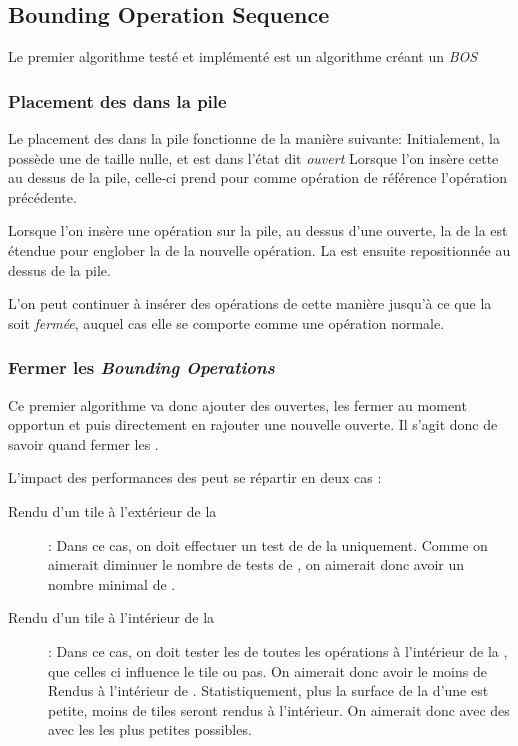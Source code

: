 		\subsection{Bounding Operation Sequence}
			Le premier algorithme testé et implémenté est un algorithme créant un \emph{BOS}
			
			\subsubsection{Placement des \BO dans la pile}
			Le placement des \BO dans la pile fonctionne de la manière suivante: Initialement, la \BO possède une \BB
			de taille nulle, et est dans l'état dit \emph{ouvert} Lorsque l'on insère cette \BO au dessus de la pile, 
			celle-ci prend pour comme opération de référence l'opération précédente. 

			Lorsque l'on insère une opération sur la pile, au dessus d'une \BO ouverte, la \BB de la \BO est étendue
			pour englober la \BB de la nouvelle opération. La \BB est ensuite repositionnée au dessus de la pile. 

			L'on peut continuer à insérer des opérations de cette manière jusqu'à ce que la \BO soit \emph{fermée},
			auquel cas elle se comporte comme une opération normale. 

			\subsubsection{Fermer les \emph{Bounding Operations}}
			Ce premier algorithme va donc ajouter des \BO ouvertes, les fermer au moment opportun et puis directement 
			en rajouter une nouvelle ouverte. Il s'agit donc de savoir quand fermer les \BO.

			L'impact des performances des \BO peut se répartir en deux cas :
			\begin{description}
				\item[Rendu d'un tile à l'extérieur de la \BO]: Dans ce cas, on doit effectuer un test de \BB de la \BO
				uniquement. Comme on aimerait diminuer le nombre de tests de \BB, on aimerait donc avoir un nombre minimal
				de \BO.
				\item[Rendu d'un tile à l'intérieur de la \BB]: Dans ce cas, on doit tester les \BB de toutes les 
				opérations à l'intérieur de la \BO, que celles ci influence le tile ou pas. On aimerait donc avoir le moins
				de Rendus à l'intérieur de \BO. Statistiquement, plus la surface de la \BB d'une \BO est petite, moins de
				tiles seront rendus à l'intérieur. On aimerait donc avec des \BO avec les \BB les plus petites possibles.
			\end{description}
			

